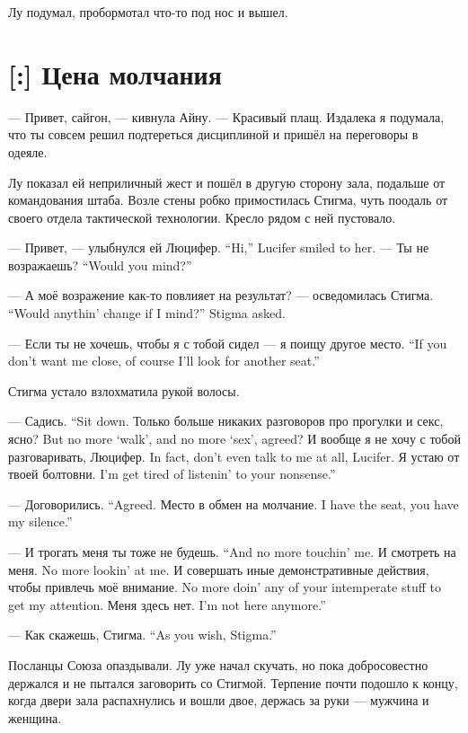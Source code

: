 Лу подумал, пробормотал что-то под нос и вышел.

\section{[:] Цена молчания}

--- Привет, сайгон, --- кивнула Айну.
--- Красивый плащ.
Издалека я подумала, что ты совсем решил подтереться дисциплиной и пришёл на переговоры в одеяле.

Лу показал ей неприличный жест и пошёл в другую сторону зала, подальше от командования штаба.
Возле стены робко примостилась Стигма, чуть поодаль от своего отдела тактической технологии.
Кресло рядом с ней пустовало.

{--- Привет, --- улыбнулся ей Люцифер.}
{``Hi,'' Lucifer smiled to her.}
{--- Ты не возражаешь?}
{``Would you mind?''}

{--- А моё возражение как-то повлияет на результат? --- осведомилась Стигма.}
{``Would anythin' change if I mind?'' Stigma asked.}

{--- Если ты не хочешь, чтобы я с тобой сидел --- я поищу другое место.}
{``If you don't want me close, of course I'll look for another seat.''}

Стигма устало взлохматила рукой волосы.

{--- Садись.}
{``Sit down.}
{Только больше никаких разговоров про прогулки и секс, ясно?}
{But no more `walk', and no more `sex', agreed?}
{И вообще я не хочу с тобой разговаривать, Люцифер.}
{In fact, don't even talk to me at all, Lucifer.}
{Я устаю от твоей болтовни.}
{I'm get tired of listenin' to your nonsense.''}

{--- Договорились.}
{``Agreed.}
{Место в обмен на молчание.}
{I have the seat, you have my silence.''}

{--- И трогать меня ты тоже не будешь.}
{``And no more touchin' me.}
{И смотреть на меня.}
{No more lookin' at me.}
{И совершать иные демонстративные действия, чтобы привлечь моё внимание.}
{No more doin' any of your intemperate stuff to get my attention.}
{Меня здесь нет.}
{I'm not here anymore.''}

{--- Как скажешь, Стигма.}
{``As you wish, Stigma.''}

Посланцы Союза опаздывали.
Лу уже начал скучать, но пока добросовестно держался и не пытался заговорить со Стигмой.
Терпение почти подошло к концу, когда двери зала распахнулись и вошли двое, держась за руки --- мужчина и женщина.

